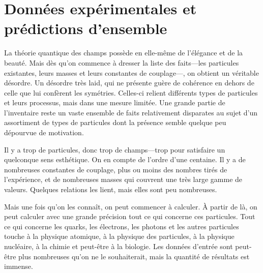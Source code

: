 \begin{classroomqa}
\end{classroomqa}

\section{Données expérimentales et prédictions d’ensemble}

La théorie quantique des champs possède en elle-même de l’élégance et de la beauté. Mais dès qu’on commence à dresser la liste des faits---les particules existantes, leurs masses et leurs constantes de couplage---, on obtient un véritable désordre. Un désordre très laid, qui ne présente guère de cohérence en dehors de celle que lui confèrent les symétries. Celles-ci relient différents types de particules et leurs processus, mais dans une mesure limitée. Une grande partie de l’inventaire reste un vaste ensemble de faits relativement disparates au sujet d’un assortiment de types de particules dont la présence semble quelque peu dépourvue de motivation.

\begin{classroomqa}
\end{classroomqa}

Il y a trop de particules, donc trop de champs---trop pour satisfaire un quelconque sens esthétique. On en compte de l’ordre d’une centaine. Il y a de nombreuses constantes de couplage, plus ou moins des nombres tirés de l’expérience, et de nombreuses masses qui couvrent une très large gamme de valeurs. Quelques relations les lient, mais elles sont peu nombreuses.

Mais une fois qu’on les connaît, on peut commencer à calculer. À partir de là, on peut calculer avec une grande précision tout ce qui concerne ces particules. Tout ce qui concerne les quarks, les électrons, les photons et les autres particules touche à la physique atomique, à la physique des particules, à la physique nucléaire, à la chimie et peut-être à la biologie. Les données d’entrée sont peut-être plus nombreuses qu’on ne le souhaiterait, mais la quantité de résultats est immense.

